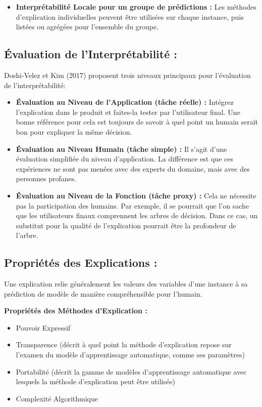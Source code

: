 \begin{itemize}
    \item \textbf{Interprétabilité Locale pour un groupe de prédictions :} Les méthodes d'explication individuelles peuvent être utilisées sur chaque instance, puis listées ou agrégées pour l'ensemble du groupe.

\end{itemize}

\subsection{Évaluation de l'Interprétabilité :}

Doshi-Velez et Kim (2017) proposent trois niveaux principaux pour l'évaluation de l'interprétabilité:

\begin{itemize}
    
    \item \textbf{Évaluation au Niveau de l'Application (tâche réelle) :} Intégrez l'explication dans le produit et faites-la tester par l'utilisateur final. Une bonne référence pour cela est toujours de savoir à quel point un humain serait bon pour expliquer la même décision.
    
    \item \textbf{Évaluation au Niveau Humain (tâche simple) :} Il s'agit d'une évaluation simplifiée du niveau d'application. La différence est que ces expériences ne sont pas menées avec des experts du domaine, mais avec des personnes profanes.
    
    \item \textbf{Évaluation au Niveau de la Fonction (tâche proxy) :} Cela ne nécessite pas la participation des humains. Par exemple, il se pourrait que l'on sache que les utilisateurs finaux comprennent les arbres de décision. Dans ce cas, un substitut pour la qualité de l'explication pourrait être la profondeur de l'arbre.
    
\end{itemize}

\subsection{Propriétés des Explications :}

Une explication relie généralement les valeurs des variables d'une instance à sa prédiction de modèle de manière compréhensible pour l'humain.

\textbf{Propriétés des Méthodes d'Explication :}
\begin{itemize}
   \item Pouvoir Expressif
   \item Transparence (décrit à quel point la méthode d'explication repose sur l'examen du modèle d'apprentissage automatique, comme ses paramètres)
   \item Portabilité (décrit la gamme de modèles d'apprentissage automatique avec lesquels la méthode d'explication peut être utilisée)
   \item Complexité Algorithmique
\end{itemize}


